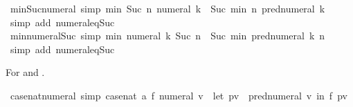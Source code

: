 \begin{isabellebody}
\isanewline
%
\endisadelimproof
\isanewline
{}\isamarkupfalse%
\ min{\isacharunderscore}{\kern0pt}Suc{\isacharunderscore}{\kern0pt}numeral\ {\isacharbrackleft}{\kern0pt}simp{\isacharbrackright}{\kern0pt}{\isacharcolon}{\kern0pt}\ {\isachardoublequoteopen}min\ {\isacharparenleft}{\kern0pt}Suc\ n{\isacharparenright}{\kern0pt}\ {\isacharparenleft}{\kern0pt}numeral\ k{\isacharparenright}{\kern0pt}\ {\isacharequal}{\kern0pt}\ Suc\ {\isacharparenleft}{\kern0pt}min\ n\ {\isacharparenleft}{\kern0pt}pred{\isacharunderscore}{\kern0pt}numeral\ k{\isacharparenright}{\kern0pt}{\isacharparenright}{\kern0pt}{\isachardoublequoteclose}\isanewline
%
\isadelimproof
\ \ %
\endisadelimproof
%
\isatagproof
{}\isamarkupfalse%
\ {\isacharparenleft}{\kern0pt}simp\ add{\isacharcolon}{\kern0pt}\ numeral{\isacharunderscore}{\kern0pt}eq{\isacharunderscore}{\kern0pt}Suc{\isacharparenright}{\kern0pt}%
\endisatagproof
{\isafoldproof}%
%
\isadelimproof
\isanewline
%
\endisadelimproof
\isanewline
{}\isamarkupfalse%
\ min{\isacharunderscore}{\kern0pt}numeral{\isacharunderscore}{\kern0pt}Suc\ {\isacharbrackleft}{\kern0pt}simp{\isacharbrackright}{\kern0pt}{\isacharcolon}{\kern0pt}\ {\isachardoublequoteopen}min\ {\isacharparenleft}{\kern0pt}numeral\ k{\isacharparenright}{\kern0pt}\ {\isacharparenleft}{\kern0pt}Suc\ n{\isacharparenright}{\kern0pt}\ {\isacharequal}{\kern0pt}\ Suc\ {\isacharparenleft}{\kern0pt}min\ {\isacharparenleft}{\kern0pt}pred{\isacharunderscore}{\kern0pt}numeral\ k{\isacharparenright}{\kern0pt}\ n{\isacharparenright}{\kern0pt}{\isachardoublequoteclose}\isanewline
%
\isadelimproof
\ \ %
\endisadelimproof
%
\isatagproof
{}\isamarkupfalse%
\ {\isacharparenleft}{\kern0pt}simp\ add{\isacharcolon}{\kern0pt}\ numeral{\isacharunderscore}{\kern0pt}eq{\isacharunderscore}{\kern0pt}Suc{\isacharparenright}{\kern0pt}%
\endisatagproof
{\isafoldproof}%
%
\isadelimproof
%
\endisadelimproof
%
\begin{isamarkuptext}%
For  and .%
\end{isamarkuptext}\isamarkuptrue%
\isamarkupfalse%
\ case{\isacharunderscore}{\kern0pt}nat{\isacharunderscore}{\kern0pt}numeral\ {\isacharbrackleft}{\kern0pt}simp{\isacharbrackright}{\kern0pt}{\isacharcolon}{\kern0pt}\ {\isachardoublequoteopen}case{\isacharunderscore}{\kern0pt}nat\ a\ f\ {\isacharparenleft}{\kern0pt}numeral\ v{\isacharparenright}{\kern0pt}\ {\isacharequal}{\kern0pt}\ {\isacharparenleft}{\kern0pt}let\ pv\ {\isacharequal}{\kern0pt}\ pred{\isacharunderscore}{\kern0pt}numeral\ v\ in\ f\ pv{\isacharparenright}{\kern0pt}{\isachardoublequoteclose}\isanewline

\end{isabellebody}
